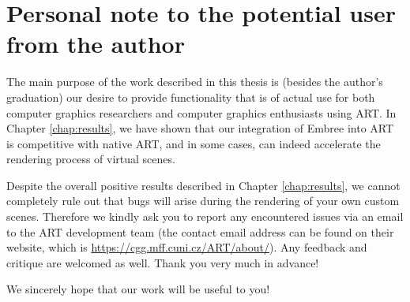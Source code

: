 \section*{Personal note to the potential user from the author}

The main purpose of the work described in this thesis is (besides the author's graduation) our desire to provide functionality that is of actual use for both computer graphics researchers and computer graphics enthusiasts using ART. In Chapter \ref{chap:results}, we have shown that our integration of Embree into ART is competitive with native ART, and in some cases, can indeed accelerate the rendering process of virtual scenes.

Despite the overall positive results described in Chapter \ref{chap:results}, we cannot completely rule out that bugs will arise during the rendering of your own custom scenes. Therefore we kindly ask you to report any encountered issues via an email to the ART development team (the contact email address can be found on their website, which is \href{https://cgg.mff.cuni.cz/ART/about/}{https://cgg.mff.cuni.cz/ART/about/}). Any feedback and critique are welcomed as well. Thank you very much in advance!

We sincerely hope that our work will be useful to you!